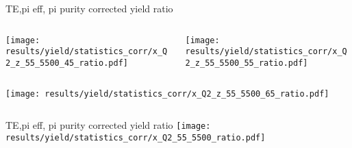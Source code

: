 \begin{frame}{TE,pi eff, pi purity corrected yield ratio}
\begin{columns}
\begin{column}[T]{0.5\textwidth}
\texttt{[image: results/yield/statistics\_corr/x\_Q2\_z\_55\_5500\_45\_ratio.pdf]}
\end{column}
\begin{column}[T]{0.5\textwidth}
\texttt{[image: results/yield/statistics\_corr/x\_Q2\_z\_55\_5500\_55\_ratio.pdf]}
\end{column}
\end{columns}
\begin{columns}
\begin{column}[T]{0.5\textwidth}
\texttt{[image: results/yield/statistics\_corr/x\_Q2\_z\_55\_5500\_65\_ratio.pdf]}
\end{column}
\begin{column}[T]{0.5\textwidth}
\end{column}
\end{columns}
\end{frame}
\begin{frame}{TE,pi eff, pi purity corrected yield ratio}
\texttt{[image: results/yield/statistics\_corr/x\_Q2\_55\_5500\_ratio.pdf]}
\end{frame}
